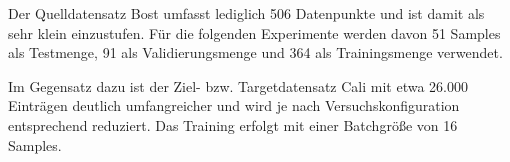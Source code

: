 Der Quelldatensatz Bost umfasst lediglich 506 Datenpunkte und ist damit als sehr klein einzustufen. Für die folgenden Experimente werden davon 
51 Samples als Testmenge, 91 als Validierungsmenge und 364 als Trainingsmenge verwendet.

Im Gegensatz dazu ist der Ziel- bzw. Targetdatensatz Cali mit etwa 26.000 Einträgen deutlich umfangreicher und wird je nach Versuchskonfiguration 
entsprechend reduziert. Das Training erfolgt mit einer Batchgröße von 16 Samples.
